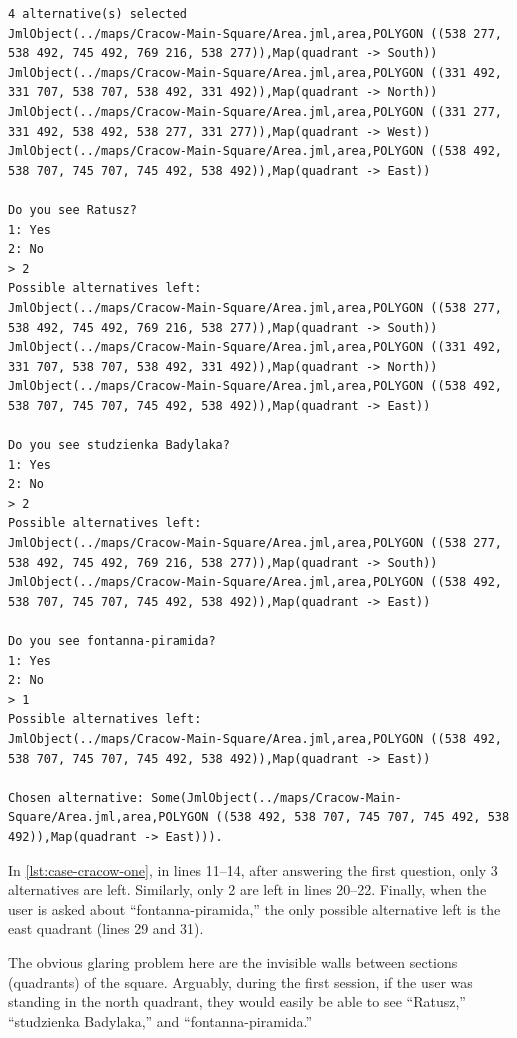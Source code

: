 \begin{lstlisting}[label={lst:case-cracow-one},caption={Mediation between all 4 quadrants. User is in the east one.}]
4 alternative(s) selected
JmlObject(../maps/Cracow-Main-Square/Area.jml,area,POLYGON ((538 277, 538 492, 745 492, 769 216, 538 277)),Map(quadrant -> South))
JmlObject(../maps/Cracow-Main-Square/Area.jml,area,POLYGON ((331 492, 331 707, 538 707, 538 492, 331 492)),Map(quadrant -> North))
JmlObject(../maps/Cracow-Main-Square/Area.jml,area,POLYGON ((331 277, 331 492, 538 492, 538 277, 331 277)),Map(quadrant -> West))
JmlObject(../maps/Cracow-Main-Square/Area.jml,area,POLYGON ((538 492, 538 707, 745 707, 745 492, 538 492)),Map(quadrant -> East))

Do you see Ratusz?
1: Yes
2: No
> 2
Possible alternatives left:
JmlObject(../maps/Cracow-Main-Square/Area.jml,area,POLYGON ((538 277, 538 492, 745 492, 769 216, 538 277)),Map(quadrant -> South))
JmlObject(../maps/Cracow-Main-Square/Area.jml,area,POLYGON ((331 492, 331 707, 538 707, 538 492, 331 492)),Map(quadrant -> North))
JmlObject(../maps/Cracow-Main-Square/Area.jml,area,POLYGON ((538 492, 538 707, 745 707, 745 492, 538 492)),Map(quadrant -> East))

Do you see studzienka Badylaka?
1: Yes
2: No
> 2
Possible alternatives left:
JmlObject(../maps/Cracow-Main-Square/Area.jml,area,POLYGON ((538 277, 538 492, 745 492, 769 216, 538 277)),Map(quadrant -> South))
JmlObject(../maps/Cracow-Main-Square/Area.jml,area,POLYGON ((538 492, 538 707, 745 707, 745 492, 538 492)),Map(quadrant -> East))

Do you see fontanna-piramida?
1: Yes
2: No
> 1
Possible alternatives left:
JmlObject(../maps/Cracow-Main-Square/Area.jml,area,POLYGON ((538 492, 538 707, 745 707, 745 492, 538 492)),Map(quadrant -> East))

Chosen alternative: Some(JmlObject(../maps/Cracow-Main-Square/Area.jml,area,POLYGON ((538 492, 538 707, 745 707, 745 492, 538 492)),Map(quadrant -> East))).
\end{lstlisting}

In \cref{lst:case-cracow-one}, in lines 11--14, after answering the first question, only 3 alternatives are left. Similarly, only 2 are left in lines 20--22. Finally, when the user is asked about ``fontanna-piramida,'' the only possible alternative left is the east quadrant (lines 29 and 31).

The obvious glaring problem here are the invisible walls between sections (quadrants) of the square. Arguably, during the first session, if the user was standing in the north quadrant, they would easily be able to see ``Ratusz,'' ``studzienka Badylaka,'' and ``fontanna-piramida.''

